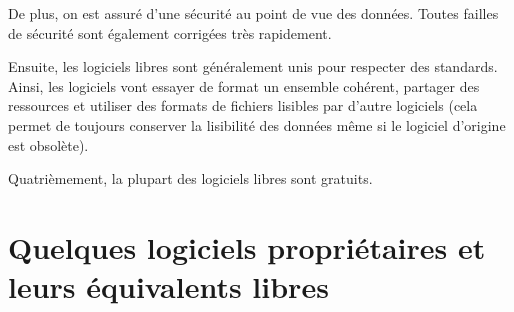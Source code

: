 De plus, on est assuré d'une sécurité au point de vue des données. Toutes failles de sécurité sont également corrigées très rapidement.

Ensuite, les logiciels libres sont généralement unis pour respecter des standards. Ainsi, les logiciels vont essayer de format un ensemble cohérent, partager des ressources et utiliser des formats de fichiers lisibles par d'autre logiciels (cela permet de toujours conserver la lisibilité des données même si le logiciel d'origine est obsolète). %

Quatrièmement, la plupart des logiciels libres sont gratuits.

\section*{Quelques logiciels propriétaires et leurs équivalents libres}

